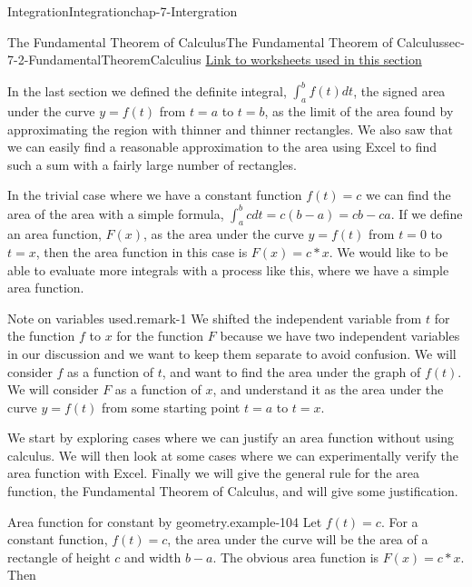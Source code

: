 \documentclass[oneside,10pt,]{book}
\numberwithin{equation}{section}
\begin{document}
\begin{chapterptx}{Integration}{}{Integration}{}{}{chap-7-Intergration}
\typeout{************************************************}
%
\begin{sectionptx}{The Fundamental Theorem of Calculus}{}{The Fundamental Theorem of Calculus}{}{}{sec-7-2-FundamentalTheoremCalculius}
\hypertarget{p-2619}{}%
\href{./Examples/Section-7-2-Examples.xlsx}{Link to worksheets used in this section}%
\par
\hypertarget{p-2620}{}%
In the last section we defined the definite integral, \(\int_a^b f(t)dt\), the signed area under the curve \(y= f(t)\) from \(t=a\) to \(t=b\), as the limit of the area found by approximating the region with thinner and thinner rectangles.  We also saw that we can easily find a reasonable approximation to the area using Excel to find such a sum with a fairly large number of rectangles.%
\par
\hypertarget{p-2621}{}%
In the trivial case where we have a constant function \(f(t)=c\) we can find the area of the area with a simple formula, \(\int_a^bc dt=c(b-a)=cb-ca\). If we define an area function, \(F(x)\), as the area under the curve \(y=f(t)\) from \(t=0\) to \(t=x\), then the area function in this case is  \(F(x)=c*x\).  We would like to be able to evaluate more integrals with a process like this, where we have a simple area function.%
\begin{remark}{Note on variables used.}{remark-1}%
\hypertarget{p-2622}{}%
We shifted the independent variable from \(t\) for the function \(f\) to \(x\) for the function \(F\) because we have two independent variables in our discussion and we want to keep them separate to avoid confusion.  We will consider \(f\) as a function of \(t\), and want to find the area under the graph of \(f(t)\).  We will consider \(F\) as a function of \(x\), and understand it as the area under the curve \(y=f(t)\) from some starting point \(t=a\) to \(t=x\).%
\end{remark}
\hypertarget{p-2623}{}%
We start by exploring cases where we can justify an area function without using calculus.  We will then look at some cases where we can experimentally verify the area function with Excel.  Finally we will give the general rule for the area function, the Fundamental Theorem of Calculus, and will give some justification.%
\begin{example}{Area function for constant by geometry.}{example-104}%
\hypertarget{p-2624}{}%
Let \(f(t)=c\).  For a constant function, \(f(t)=c\), the area under the curve will be the area of a rectangle of height \(c\) and width \(b-a\).  The obvious area function is \(F(x)=c*x\).  Then%

\end{example}
\end{sectionptx}
\end{chapterptx}
\end{document}
